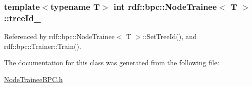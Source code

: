\subsubsection[{\texorpdfstring{tree\+Id\+\_\+}{treeId_}}]{\setlength{\rightskip}{0pt plus 5cm}template$<$typename T$>$ int {\bf rdf\+::bpc\+::\+Node\+Trainee}$<$ T $>$\+::tree\+Id\+\_\+}\hypertarget{classrdf_1_1bpc_1_1NodeTrainee_a04ec4bdb96ed7d47ab99e6a4f65294f3}{}\label{classrdf_1_1bpc_1_1NodeTrainee_a04ec4bdb96ed7d47ab99e6a4f65294f3}


Referenced by rdf\+::bpc\+::\+Node\+Trainee$<$ T $>$\+::\+Set\+Tree\+Id(), and rdf\+::bpc\+::\+Trainer\+::\+Train().



The documentation for this class was generated from the following file\+:\begin{DoxyCompactItemize}
\item 
\hyperlink{NodeTraineeBPC_8h}{Node\+Trainee\+B\+P\+C.\+h}\end{DoxyCompactItemize}
